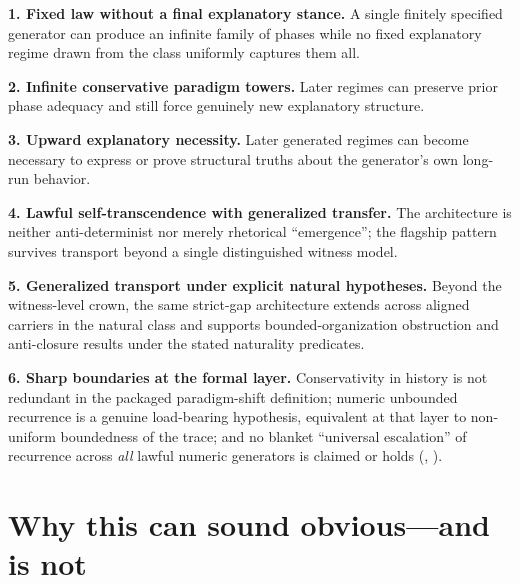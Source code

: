 \documentclass[11pt,a4paper]{article}
\newenvironment{keybox}[1]{%
  \Needspace*{8\baselineskip}%
  \begin{tcolorbox}[
    enhanced, breakable=false,
    colback=blue!5, colframe=blue!45!black, coltitle=black,
    colbacktitle=blue!14, boxrule=0.85pt, arc=2.5pt,
    left=9pt, right=9pt, top=6pt, bottom=6pt,
    titlerule=0.55pt, fonttitle=\bfseries, title={#1},
    before upper=\raggedright,
    before skip=0.9\baselineskip, after skip=0.9\baselineskip
  ]%
}{%
  \end{tcolorbox}%
}
\theoremstyle{definition}
\begin{document}
\begin{keybox}{Six central claims}
\textbf{1. Fixed law without a final explanatory stance.} A single finitely specified generator can produce an infinite family of phases while no fixed explanatory regime drawn from the class uniformly captures them all.

\medskip
\textbf{2. Infinite conservative paradigm towers.} Later regimes can preserve prior phase adequacy and still force genuinely new explanatory structure.

\medskip
\textbf{3. Upward explanatory necessity.} Later generated regimes can become necessary to express or prove structural truths about the generator's own long-run behavior.

\medskip
\textbf{4. Lawful self-transcendence with generalized transfer.} The architecture is neither anti-determinist nor merely rhetorical ``emergence''; the flagship pattern survives transport beyond a single distinguished witness model.

\medskip
\textbf{5. Generalized transport under explicit natural hypotheses.} Beyond the witness-level crown, the same strict-gap architecture extends across aligned carriers in the natural class and supports bounded-organization obstruction and anti-closure results under the stated naturality predicates.

\medskip
\textbf{6. Sharp boundaries at the formal layer.} Conservativity in history is not redundant in the packaged paradigm-shift definition; numeric unbounded recurrence is a genuine load-bearing hypothesis, equivalent at that layer to non-uniform boundedness of the trace; and no blanket ``universal escalation'' of recurrence across \emph{all} lawful numeric generators is claimed or holds (, ).
\end{keybox}

\section{Why this can sound obvious---and is not}\label{sec:sounds-obvious}
\end{document}
